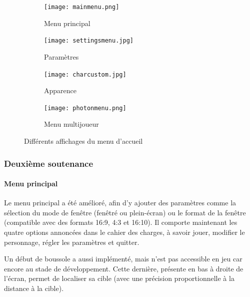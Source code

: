             \begin{figure}[hbt!]
                \centering
                \captionsetup{justification=centering}
                \begin{subfigure}[b]{0.3\textwidth}
                    \texttt{[image: mainmenu.png]} 
                    \caption{Menu principal}
                \end{subfigure}
                \hspace{150pt}
                \begin{subfigure}[b]{0.3\textwidth}
                    \texttt{[image: settingsmenu.jpg]} 
                    \caption{Paramètres}
                \end{subfigure}
                \begin{subfigure}[b]{0.3\textwidth}
                    \texttt{[image: charcustom.jpg]} 
                    \caption{Apparence}
                \end{subfigure}
                \begin{subfigure}[b]{0.3\textwidth}
                    \texttt{[image: photonmenu.png]} 
                    \caption{Menu multijoueur}
                \end{subfigure}
                \caption{Différents affichages du menu d'accueil}
            \end{figure}


    \vspace{0.5cm}
    \subsubsection{Deuxième soutenance}
    \vspace{0.5cm}
    
        \paragraph{Menu principal}
        
            Le menu principal a été amélioré, afin d'y ajouter des paramètres comme la sélection du mode de fenêtre (fenêtré 
            ou plein-écran) ou le format de la fenêtre (compatible avec des formats 16:9, 4:3 et 16:10).
            Il comporte maintenant les quatre options annoncées dans le cahier des charges, à savoir jouer, modifier le personnage, 
            régler les paramètres et quitter.

            Un début de boussole a aussi implémenté, mais n'est pas accessible en jeu car encore au stade de développement. Cette dernière, 
            présente en bas à droite de l'écran, permet de localiser sa cible (avec une précision proportionnelle à la distance à la cible).


